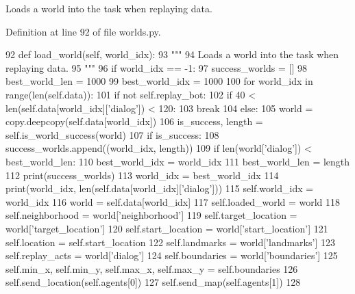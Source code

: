 \begin{DoxyVerb}Loads a world into the task when replaying data.
\end{DoxyVerb}
 

Definition at line 92 of file worlds.\+py.


\begin{DoxyCode}
92     \textcolor{keyword}{def }load\_world(self, world\_idx):
93         \textcolor{stringliteral}{"""}
94 \textcolor{stringliteral}{        Loads a world into the task when replaying data.}
95 \textcolor{stringliteral}{        """}
96         \textcolor{keywordflow}{if} world\_idx == -1:
97             success\_worlds = []
98             best\_world\_len = 1000
99             best\_world\_idx = 1000
100             \textcolor{keywordflow}{for} world\_idx \textcolor{keywordflow}{in} range(len(self.data)):
101                 \textcolor{keywordflow}{if} \textcolor{keywordflow}{not} self.replay\_bot:
102                     \textcolor{keywordflow}{if} 40 < len(self.data[world\_idx][\textcolor{stringliteral}{'dialog'}]) < 120:
103                         \textcolor{keywordflow}{break}
104                 \textcolor{keywordflow}{else}:
105                     world = copy.deepcopy(self.data[world\_idx])
106                     is\_success, length = self.is\_world\_success(world)
107                     \textcolor{keywordflow}{if} is\_success:
108                         success\_worlds.append((world\_idx, length))
109                         \textcolor{keywordflow}{if} len(world[\textcolor{stringliteral}{'dialog'}]) < best\_world\_len:
110                             best\_world\_idx = world\_idx
111                             best\_world\_len = length
112             print(success\_worlds)
113             world\_idx = best\_world\_idx
114         print(world\_idx, len(self.data[world\_idx][\textcolor{stringliteral}{'dialog'}]))
115         self.world\_idx = world\_idx
116         world = self.data[world\_idx]
117         self.loaded\_world = world
118         self.neighborhood = world[\textcolor{stringliteral}{'neighborhood'}]
119         self.target\_location = world[\textcolor{stringliteral}{'target\_location'}]
120         self.start\_location = world[\textcolor{stringliteral}{'start\_location'}]
121         self.location = self.start\_location
122         self.landmarks = world[\textcolor{stringliteral}{'landmarks'}]
123         self.replay\_acts = world[\textcolor{stringliteral}{'dialog'}]
124         self.boundaries = world[\textcolor{stringliteral}{'boundaries'}]
125         self.min\_x, self.min\_y, self.max\_x, self.max\_y = self.boundaries
126         self.send\_location(self.agents[0])
127         self.send\_map(self.agents[1])
128 
\end{DoxyCode}
